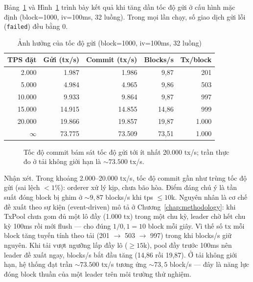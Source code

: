 Bảng~\ref{tab:eval-tps} và Hình~\ref{fig:eval-tps} trình bày kết quả khi tăng dần
tốc độ gửi ở cấu hình mặc định (block=1000, iv=100ms, 32 luồng). Trong mọi lần
chạy, số giao dịch gửi lỗi (\texttt{failed}) đều bằng 0.

\begin{table}[H]
\centering
\caption{Ảnh hưởng của tốc độ gửi (block=1000, iv=100ms, 32 luồng)}
\label{tab:eval-tps}
\begin{tabular}{@{}rrrrr@{}}
\toprule
\textbf{TPS đặt} & \textbf{Gửi (tx/s)} & \textbf{Commit (tx/s)} & \textbf{Blocks/s} & \textbf{Tx/block} \\
\midrule
2.000    & 1.987  & 1.986  & 9,87  & 201 \\
5.000    & 4.984  & 4.965  & 9,86  & 503 \\
10.000   & 9.933  & 9.864  & 9,87  & 997 \\
15.000   & 14.915 & 14.855 & 14,86 & 999 \\
20.000   & 19.866 & 19.857 & 19,87 & 1.000 \\
$\infty$ & 73.775 & 73.509 & 73,51 & 1.000 \\
\bottomrule
\end{tabular}
\end{table}

\begin{figure}[H]
\centering
{}
\caption{Tốc độ commit bám sát tốc độ gửi tới ít nhất 20.000 tx/s; trần thực đo ở
tải không giới hạn là ${\sim}73.500$ tx/s.}
\label{fig:eval-tps}
\end{figure}

Nhận xét. Trong khoảng 2.000--20.000 tx/s, tốc độ commit gần như trùng
tốc độ gửi (sai lệch $<1\%$): orderer xử lý kịp, chưa bão hòa. Điểm đáng chú ý là
tần suất đóng block bị ghim ở ${\sim}9,87$ blocks/s khi tps $\le 10$k.
Nguyên nhân là cơ chế đề xuất theo sự kiện (event-driven) mô tả ở
Chương~\ref{chap:methodology}: khi TxPool chưa gom đủ một lô đầy (1.000 tx) trong
một chu kỳ, leader chờ hết chu kỳ 100ms rồi mới flush --- cho đúng $1/0{,}1 = 10$
block mỗi giây. Vì thế số tx mỗi block tăng tuyến tính theo tải (201 $\to$ 503
$\to$ 997) trong khi blocks/s giữ nguyên. Khi tải vượt ngưỡng lấp đầy lô
(${\ge}15$k), pool đầy trước 100ms nên leader đề xuất ngay, blocks/s bắt đầu tăng
(14,86 rồi 19,87). Ở tải không giới hạn, hệ thống đạt trần
${\sim}73.500$ tx/s tương ứng ${\sim}73,5$ block/s --- đây là năng lực
đóng block thuần của một leader trên môi trường thử nghiệm.

